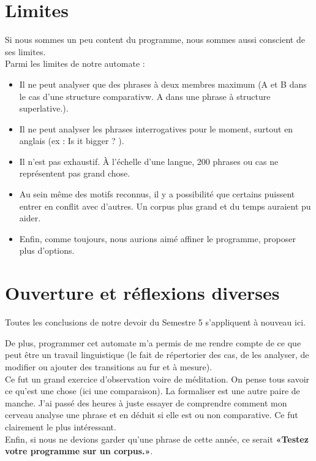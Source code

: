  \section{Limites}

Si nous sommes un peu content du programme, nous sommes aussi conscient de ses limites. \\

Parmi les limites de notre automate  : 
\begin{itemize}
\item Il ne peut analyser que des phrases à deux membres maximum (A et B dans le cas d'une structure comparativw. A dans une phrase à structure superlative.). \\

\item Il ne peut analyser les phrases interrogatives pour le moment, surtout en anglais (ex : Is it bigger ? ). \\
 
\item Il n'est pas exhaustif. À l'échelle d'une langue, 200 phrases ou cas ne représentent pas grand chose. \\

\item Au sein même des motifs reconnus, il y a possibilité que certains puissent entrer en conflit avec d'autres. Un corpus plus grand et du temps auraient pu aider. \\

\item Enfin, comme toujours, nous aurions aimé affiner le programme, proposer plus d'options.
\end{itemize}

\section{Ouverture et réflexions diverses}

Toutes les conclusions de notre devoir du Semestre 5 s'appliquent à nouveau ici.

De plus, programmer cet automate m'a permis de me rendre compte de ce que peut être un travail linguistique (le fait de répertorier des cas, de les analyser, de modifier ou ajouter des transitions au fur et à mesure). \\

Ce fut un grand exercice d'observation voire de méditation. On pense tous savoir ce qu'est une chose (ici une comparaison). La formaliser est une autre paire de manche. J'ai passé des heures à juste essayer de comprendre comment mon cerveau analyse une phrase et en déduit si elle est ou non comparative. Ce fut clairement le plus intéressant. \\

Enfin, si nous ne devions garder qu'une phrase de cette année, ce serait \textbf{«Testez votre programme sur un corpus.»}. \\









